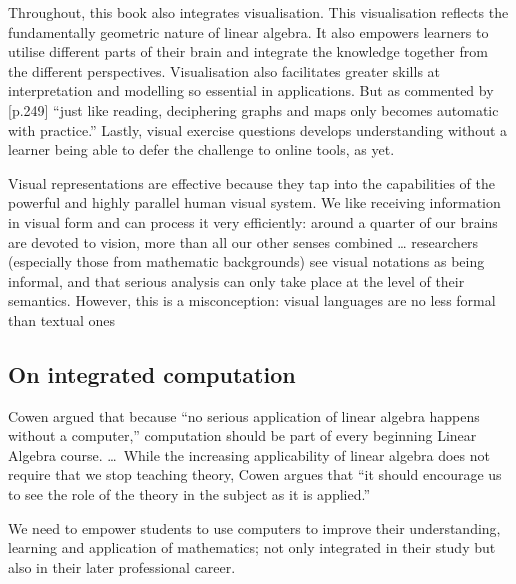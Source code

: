 Throughout, this book also integrates visualisation.
This visualisation reflects the fundamentally geometric nature of linear algebra.  
It also empowers learners to utilise different parts of their brain and integrate the knowledge together from the different perspectives.
Visualisation also facilitates greater skills at interpretation and modelling so essential in applications.
But as commented by \cite{Fara2009} [p.249] ``just like reading, deciphering graphs and maps only becomes automatic with practice.''
Lastly, visual exercise questions develops understanding without a learner being able to defer the challenge to online tools, as yet.  

\begin{quoted}{\cite{Moody2009}}
Visual representations are effective because they tap into the capabilities of the powerful and highly parallel human visual system.
We like receiving information in visual form and can process it very efficiently: around a quarter of our brains are devoted to vision, more than all our other senses combined  \ldots
researchers (especially those from mathematic backgrounds) see visual notations as being informal, and that serious analysis can only take place at the level of their semantics. 
However, this is a misconception: visual languages are no less formal than textual ones
\end{quoted}









\subsection*{On integrated computation}

\begin{quoted}{\cite[p.38]{CUPMguide2015}}
Cowen argued that because ``no serious application of linear algebra happens without a computer,'' computation should be part of every beginning Linear Algebra course. \ldots\
While the increasing applicability of linear algebra does not require that we stop teaching theory, Cowen argues that ``it should encourage us to see the role of the theory in the subject as it is applied.''
\end{quoted}


We need to empower students to use computers to improve their understanding, learning and application of mathematics; not only integrated in their study but also in their later professional career.

